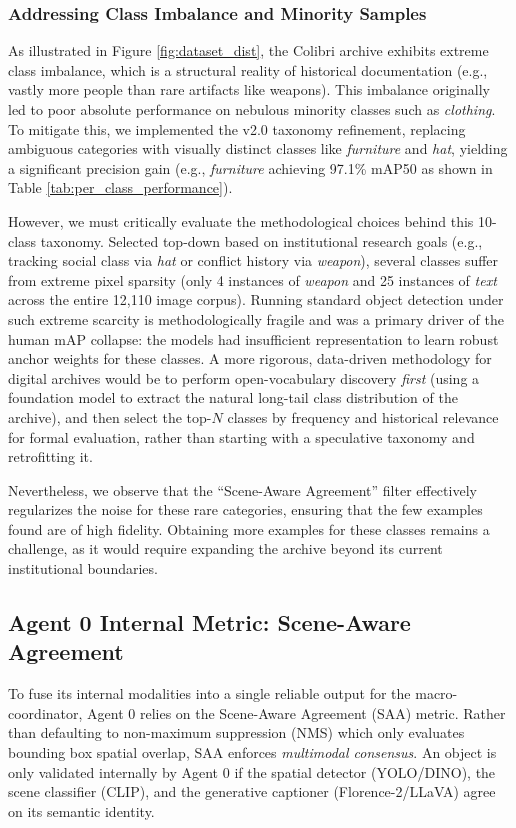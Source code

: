 \documentclass[12pt,onecolumn,a4paper]{IEEEtran}
\begin{document}
\subsubsection{Addressing Class Imbalance and Minority Samples}
As illustrated in Figure \ref{fig:dataset_dist}, the Colibri archive exhibits extreme class imbalance, which is a structural reality of historical documentation (e.g., vastly more people than rare artifacts like weapons). This imbalance originally led to poor absolute performance on nebulous minority classes such as \textit{clothing}. To mitigate this, we implemented the v2.0 taxonomy refinement, replacing ambiguous categories with visually distinct classes like \textit{furniture} and \textit{hat}, yielding a significant precision gain (e.g., \textit{furniture} achieving 97.1\% mAP50 as shown in Table \ref{tab:per_class_performance}).

However, we must critically evaluate the methodological choices behind this 10-class taxonomy. Selected top-down based on institutional research goals (e.g., tracking social class via \textit{hat} or conflict history via \textit{weapon}), several classes suffer from extreme pixel sparsity (only 4 instances of \textit{weapon} and 25 instances of \textit{text} across the entire 12,110 image corpus). Running standard object detection under such extreme scarcity is methodologically fragile and was a primary driver of the human mAP collapse: the models had insufficient representation to learn robust anchor weights for these classes. A more rigorous, data-driven methodology for digital archives would be to perform open-vocabulary discovery \textit{first} (using a foundation model to extract the natural long-tail class distribution of the archive), and then select the top-$N$ classes by frequency and historical relevance for formal evaluation, rather than starting with a speculative taxonomy and retrofitting it.

Nevertheless, we observe that the ``Scene-Aware Agreement'' filter effectively regularizes the noise for these rare categories, ensuring that the few examples found are of high fidelity. Obtaining more examples for these classes remains a challenge, as it would require expanding the archive beyond its current institutional boundaries.

\subsection{Agent 0 Internal Metric: Scene-Aware Agreement}
To fuse its internal modalities into a single reliable output for the macro-coordinator, Agent 0 relies on the Scene-Aware Agreement (SAA) metric. Rather than defaulting to non-maximum suppression (NMS) which only evaluates bounding box spatial overlap, SAA enforces \textit{multimodal consensus}. An object is only validated internally by Agent 0 if the spatial detector (YOLO/DINO), the scene classifier (CLIP), and the generative captioner (Florence-2/LLaVA) agree on its semantic identity.
\end{document}
